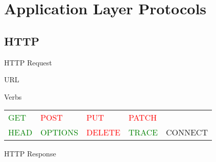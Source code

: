 \mode*
{}

\section{Application Layer Protocols}

\subsection{HTTP}

\begin{frame}
  \centering
\end{frame}

\begin{frame}{HTTP Request}
  \begin{iblock}{URL}
    \centering
    \mode<beamer>{ \texttt{[image: Url]} }%
  \end{iblock}
  \begin{center}
  \end{center}
  \begin{iblock}{Verbs}
    \begin{tabular}{lllll}
      \textcolor{Green}{GET}&\textcolor{Red}{POST}&
      \textcolor{Red}{PUT}&\textcolor{Red}{PATCH}&\\
      \textcolor{Green}{HEAD}&\textcolor{Green}{OPTIONS}&
      \textcolor{Red}{DELETE}&\textcolor{Green}{TRACE}&CONNECT
    \end{tabular}
  \end{iblock}
\end{frame}

\begin{frame}{HTTP Response}
  \centering
  \mode<beamer>{ \texttt{[image: http-Res]} }%
\end{frame}

